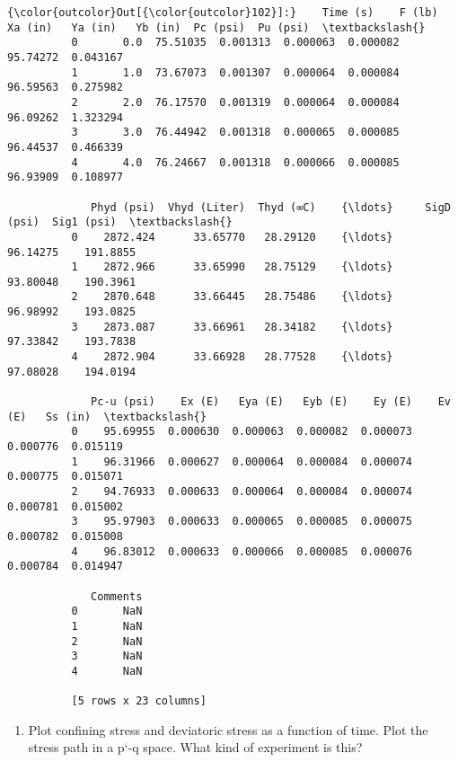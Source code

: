 \documentclass[11pt]{article}
\providecommand{\tightlist}{%
      \setlength{\itemsep}{0pt}\setlength{\parskip}{0pt}}
\begin{document}
\begin{Verbatim}[commandchars=\\\{\}]
{\color{outcolor}Out[{\color{outcolor}102}]:}    Time (s)    F (lb)   Xa (in)   Ya (in)   Yb (in)  Pc (psi)  Pu (psi)  \textbackslash{}
          0       0.0  75.51035  0.001313  0.000063  0.000082  95.74272  0.043167   
          1       1.0  73.67073  0.001307  0.000064  0.000084  96.59563  0.275982   
          2       2.0  76.17570  0.001319  0.000064  0.000084  96.09262  1.323294   
          3       3.0  76.44942  0.001318  0.000065  0.000085  96.44537  0.466339   
          4       4.0  76.24667  0.001318  0.000066  0.000085  96.93909  0.108977   
          
             Phyd (psi)  Vhyd (Liter)  Thyd (∞C)    {\ldots}     SigD (psi)  Sig1 (psi)  \textbackslash{}
          0    2872.424      33.65770   28.29120    {\ldots}       96.14275    191.8855   
          1    2872.966      33.65990   28.75129    {\ldots}       93.80048    190.3961   
          2    2870.648      33.66445   28.75486    {\ldots}       96.98992    193.0825   
          3    2873.087      33.66961   28.34182    {\ldots}       97.33842    193.7838   
          4    2872.904      33.66928   28.77528    {\ldots}       97.08028    194.0194   
          
             Pc-u (psi)    Ex (E)   Eya (E)   Eyb (E)    Ey (E)    Ev (E)   Ss (in)  \textbackslash{}
          0    95.69955  0.000630  0.000063  0.000082  0.000073  0.000776  0.015119   
          1    96.31966  0.000627  0.000064  0.000084  0.000074  0.000775  0.015071   
          2    94.76933  0.000633  0.000064  0.000084  0.000074  0.000781  0.015002   
          3    95.97903  0.000633  0.000065  0.000085  0.000075  0.000782  0.015008   
          4    96.83012  0.000633  0.000066  0.000085  0.000076  0.000784  0.014947   
          
             Comments  
          0       NaN  
          1       NaN  
          2       NaN  
          3       NaN  
          4       NaN  
          
          [5 rows x 23 columns]
\end{Verbatim}
            
    \begin{enumerate}
\def\labelenumi{(\alph{enumi})}
\tightlist
\item
  Plot confining stress and deviatoric stress as a function of time.
  Plot the stress path in a p`-q space. What kind of experiment is this?
\end{enumerate}
\end{document}
